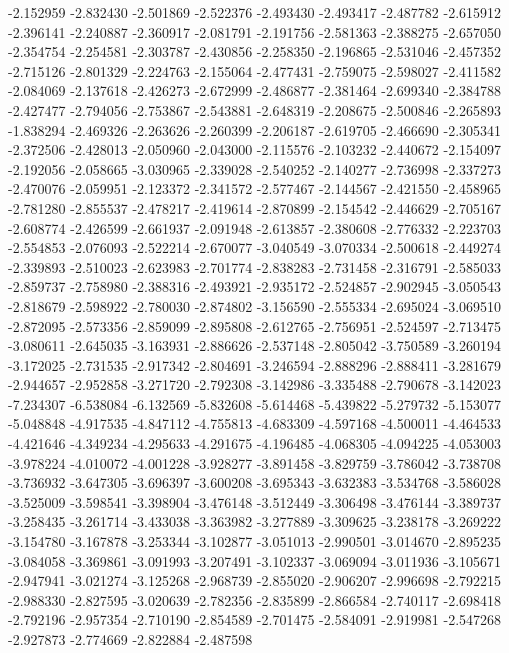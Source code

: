 -2.152959
-2.832430
-2.501869
-2.522376
-2.493430
-2.493417
-2.487782
-2.615912
-2.396141
-2.240887
-2.360917
-2.081791
-2.191756
-2.581363
-2.388275
-2.657050
-2.354754
-2.254581
-2.303787
-2.430856
-2.258350
-2.196865
-2.531046
-2.457352
-2.715126
-2.801329
-2.224763
-2.155064
-2.477431
-2.759075
-2.598027
-2.411582
-2.084069
-2.137618
-2.426273
-2.672999
-2.486877
-2.381464
-2.699340
-2.384788
-2.427477
-2.794056
-2.753867
-2.543881
-2.648319
-2.208675
-2.500846
-2.265893
-1.838294
-2.469326
-2.263626
-2.260399
-2.206187
-2.619705
-2.466690
-2.305341
-2.372506
-2.428013
-2.050960
-2.043000
-2.115576
-2.103232
-2.440672
-2.154097
-2.192056
-2.058665
-3.030965
-2.339028
-2.540252
-2.140277
-2.736998
-2.337273
-2.470076
-2.059951
-2.123372
-2.341572
-2.577467
-2.144567
-2.421550
-2.458965
-2.781280
-2.855537
-2.478217
-2.419614
-2.870899
-2.154542
-2.446629
-2.705167
-2.608774
-2.426599
-2.661937
-2.091948
-2.613857
-2.380608
-2.776332
-2.223703
-2.554853
-2.076093
-2.522214
-2.670077
-3.040549
-3.070334
-2.500618
-2.449274
-2.339893
-2.510023
-2.623983
-2.701774
-2.838283
-2.731458
-2.316791
-2.585033
-2.859737
-2.758980
-2.388316
-2.493921
-2.935172
-2.524857
-2.902945
-3.050543
-2.818679
-2.598922
-2.780030
-2.874802
-3.156590
-2.555334
-2.695024
-3.069510
-2.872095
-2.573356
-2.859099
-2.895808
-2.612765
-2.756951
-2.524597
-2.713475
-3.080611
-2.645035
-3.163931
-2.886626
-2.537148
-2.805042
-3.750589
-3.260194
-3.172025
-2.731535
-2.917342
-2.804691
-3.246594
-2.888296
-2.888411
-3.281679
-2.944657
-2.952858
-3.271720
-2.792308
-3.142986
-3.335488
-2.790678
-3.142023
-7.234307
-6.538084
-6.132569
-5.832608
-5.614468
-5.439822
-5.279732
-5.153077
-5.048848
-4.917535
-4.847112
-4.755813
-4.683309
-4.597168
-4.500011
-4.464533
-4.421646
-4.349234
-4.295633
-4.291675
-4.196485
-4.068305
-4.094225
-4.053003
-3.978224
-4.010072
-4.001228
-3.928277
-3.891458
-3.829759
-3.786042
-3.738708
-3.736932
-3.647305
-3.696397
-3.600208
-3.695343
-3.632383
-3.534768
-3.586028
-3.525009
-3.598541
-3.398904
-3.476148
-3.512449
-3.306498
-3.476144
-3.389737
-3.258435
-3.261714
-3.433038
-3.363982
-3.277889
-3.309625
-3.238178
-3.269222
-3.154780
-3.167878
-3.253344
-3.102877
-3.051013
-2.990501
-3.014670
-2.895235
-3.084058
-3.369861
-3.091993
-3.207491
-3.102337
-3.069094
-3.011936
-3.105671
-2.947941
-3.021274
-3.125268
-2.968739
-2.855020
-2.906207
-2.996698
-2.792215
-2.988330
-2.827595
-3.020639
-2.782356
-2.835899
-2.866584
-2.740117
-2.698418
-2.792196
-2.957354
-2.710190
-2.854589
-2.701475
-2.584091
-2.919981
-2.547268
-2.927873
-2.774669
-2.822884
-2.487598
